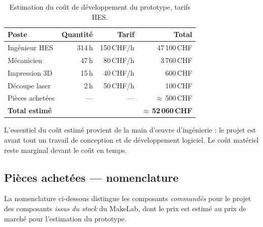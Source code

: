 \begin{table}[H]
  \centering
  \begin{tabular}{@{}p{5cm}r r r@{}}
    \toprule
    \textbf{Poste} & \textbf{Quantité} & \textbf{Tarif} & \textbf{Total} \\
    \midrule
    Ingénieur HES        & 314\,h & 150\,CHF/h & 47\,100\,CHF \\
    Mécanicien           & 47\,h  & 80\,CHF/h  & 3\,760\,CHF \\
    Impression 3D        & 15\,h  & 40\,CHF/h  & 600\,CHF \\
    Découpe laser        & 2\,h   & 50\,CHF/h  & 100\,CHF \\
    Pièces achetées      & ---    & ---        & $\approx$\,500\,CHF \\
    \midrule
    \textbf{Total estimé} & & & $\approx$\,\textbf{52\,060\,CHF} \\
    \bottomrule
  \end{tabular}
  \caption{Estimation du coût de développement du prototype, tarifs HES.}
  \label{tab:budget-estimation}
\end{table}

L'essentiel du coût estimé provient de la main d'\oe uvre d'ingénierie : le
projet est avant tout un travail de conception et de développement
logiciel. Le coût matériel reste marginal devant le coût en temps.

\subsection{Pièces achetées — nomenclature}

La nomenclature ci-dessous distingue les composants \emph{commandés} pour le
projet des composants \emph{issus du stock} du MakeLab, dont le prix est
estimé au prix de marché pour l'estimation du prototype.

